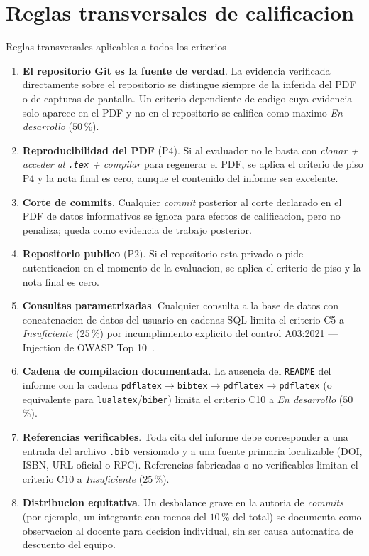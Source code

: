 \documentclass[11pt,a4paper]{article}
\begin{document}
\section{Reglas transversales de calificacion}

\begin{cajacritica}{Reglas transversales aplicables a todos los criterios}
    \begin{enumerate}
        \item \textbf{El repositorio Git es la fuente de verdad}. La evidencia verificada directamente sobre el repositorio se distingue siempre de la inferida del PDF o de capturas de pantalla. Un criterio dependiente de codigo cuya evidencia solo aparece en el PDF y no en el repositorio se califica como maximo \emph{En desarrollo} ($50$\,\%).
        \item \textbf{Reproducibilidad del PDF} (P4). Si al evaluador no le basta con \emph{clonar + acceder al \texttt{.tex} + compilar} para regenerar el PDF, se aplica el criterio de piso P4 y la nota final es cero, aunque el contenido del informe sea excelente.
        \item \textbf{Corte de commits}. Cualquier \emph{commit} posterior al corte declarado en el PDF de datos informativos se ignora para efectos de calificacion, pero no penaliza; queda como evidencia de trabajo posterior.
        \item \textbf{Repositorio publico} (P2). Si el repositorio esta privado o pide autenticacion en el momento de la evaluacion, se aplica el criterio de piso y la nota final es cero.
        \item \textbf{Consultas parametrizadas}. Cualquier consulta a la base de datos con concatenacion de datos del usuario en cadenas SQL limita el criterio C5 a \emph{Insuficiente} ($25$\,\%) por incumplimiento explicito del control A03:2021 --- Injection de OWASP Top 10~\cite{owasp2021top10}.
        \item \textbf{Cadena de compilacion documentada}. La ausencia del \texttt{README} del informe con la cadena \texttt{pdflatex$\to$bibtex$\to$pdflatex$\to$pdflatex} (o equivalente para \texttt{lualatex}/\texttt{biber}) limita el criterio C10 a \emph{En desarrollo} ($50$\,\%).
        \item \textbf{Referencias verificables}. Toda cita del informe debe corresponder a una entrada del archivo \texttt{.bib} versionado y a una fuente primaria localizable (DOI, ISBN, URL oficial o RFC). Referencias fabricadas o no verificables limitan el criterio C10 a \emph{Insuficiente} ($25$\,\%).
        \item \textbf{Distribucion equitativa}. Un desbalance grave en la autoria de \emph{commits} (por ejemplo, un integrante con menos del $10$\,\% del total) se documenta como observacion al docente para decision individual, sin ser causa automatica de descuento del equipo.
    \end{enumerate}
\end{cajacritica}
\end{document}
